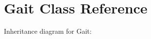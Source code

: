 \hypertarget{classGait}{}\section{Gait Class Reference}
\label{classGait}


Inheritance diagram for Gait\+:
